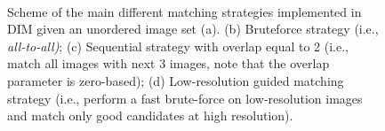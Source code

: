 \begin{figure}[ht]
  \centering
   \qquad
  \\ \vspace{2mm}
  \qquad
  \caption{Scheme of the main different matching strategies implemented in DIM given an unordered image set (a). (b) Bruteforce strategy (i.e., \textit{all-to-all)}; (c) Sequential strategy with overlap equal to 2 (i.e., match all images with next 3 images, note that the overlap parameter is zero-based); (d) Low-resolution guided matching strategy (i.e., perform a fast brute-force on low-resolution images and match only good candidates at high resolution).}
  \label{fig:5:matching_strategy}
\end{figure}

